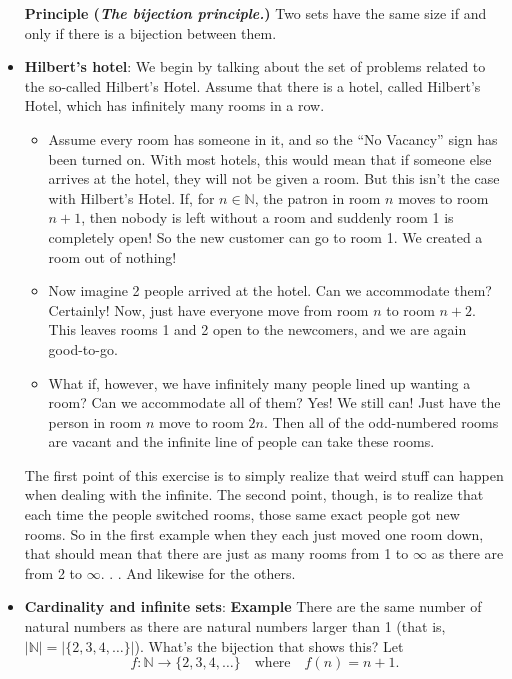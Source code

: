 \documentclass{report}
\begin{document}
\begin{itemize}
            \textbf{Principle (\textit{The bijection principle.})} Two sets have the same size if and only if there is a bijection between them.
        \item \textbf{Hilbert's hotel}: We begin by talking about the set of problems related to the so-called Hilbert’s Hotel. Assume that there is a hotel, called Hilbert’s Hotel, which has infinitely many rooms in a row.
            \bigbreak \noindent 
            \begin{itemize}
                \item Assume every room has someone in it, and so the “No Vacancy” sign has been
                    turned on. With most hotels, this would mean that if someone else arrives at
                    the hotel, they will not be given a room. But this isn’t the case with Hilbert’s
                    Hotel. If, for \( n \in \mathbb{N} \), the patron in room \( n \) moves to room \( n + 1 \), then nobody
                    is left without a room and suddenly room 1 is completely open! So the new
                    customer can go to room 1. We created a room out of nothing!
                \item Now imagine 2 people arrived at the hotel. Can we accommodate them?
                    Certainly! Now, just have everyone move from room \( n \) to room \( n + 2 \). This
                    leaves rooms 1 and 2 open to the newcomers, and we are again good-to-go.

                \item What if, however, we have infinitely many people lined up wanting a room?
                    Can we accommodate all of them? Yes! We still can! Just have the person in
                    room \( n \) move to room \( 2n \). Then all of the odd-numbered rooms are vacant and
                    the infinite line of people can take these rooms.
            \end{itemize}
            The first point of this exercise is to simply realize that weird stuff can happen
            when dealing with the infinite. The second point, though, is to realize that each time
            the people switched rooms, those same exact people got new rooms. So in the first
            example when they each just moved one room down, that should mean that there
            are just as many rooms from 1 to $\infty$ as there are from 2 to $\infty$. . . And likewise for the
            others.
        \item \textbf{Cardinality and infinite sets}:
            \bigbreak \noindent 
            \textbf{Example} There are the same number of natural numbers as there are natural
            numbers larger than 1 (that is, \( |\mathbb{N}| = |\{2, 3, 4, \dots \}| \)). What’s the bijection that shows
            this? Let
            \[
                f : \mathbb{N} \to \{2, 3, 4, \dots \} \quad \text{where} \quad f(n) = n + 1.
            \]


\end{itemize}
\end{document}
